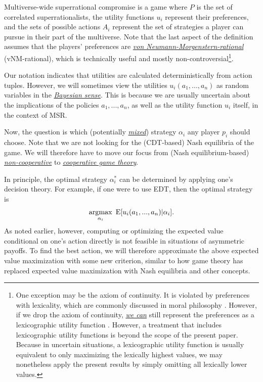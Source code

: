 Multiverse-wide superrational compromise is a game where \(P\) is the
set of correlated superrationalists, the utility functions \(u_{i}\)
represent their preferences, and the sets of possible actions \(A_{i}\)
represent the set of strategies a player can pursue in their part of the
multiverse. Note that the last aspect of the definition assumes that the
players' preferences are
\href{https://en.wikipedia.org/wiki/Von_Neumann\%E2\%80\%93Morgenstern_utility_theorem\#The_axioms}{\emph{von
Neumann-Morgenstern-rational}} (vNM-rational), which is technically
useful and mostly non-controversial\footnote{One exception may be the
  axiom of continuity. It is violated by preferences with lexicality,
  which are commonly discussed in moral philosophy
  \parencite{Knutsson2016-kd}. However, if we drop the axiom
  of continuity,
  \href{https://casparoesterheld.com/2016/08/08/lexicographic-utility-functions/}{\emph{we
  can}} still represent the preferences as a lexicographic utility
  function \parencite{Blume1989-fd,Fishburn1971-bx}.
  However, a treatment that includes lexicographic utility functions is
  beyond the scope of the present paper. Because in uncertain
  situations, a lexicographic utility function is usually equivalent to
  only maximizing the lexically highest values, we may nonetheless apply
  the present results by simply omitting all lexically lower values.}.

Our notation indicates that utilities are calculated deterministically
from action tuples. However, we will sometimes view the utilities
\(u_{i}(a_{1},...,a_{n})\) as random variables in the
\href{https://en.wikipedia.org/wiki/Bayesian_probability}{\emph{Bayesian
sense}}. This is because we are usually uncertain about the implications
of the policies \(a_{1},...,a_{n}\), as well as the utility function
\(u_{i}\) itself, in the context of MSR.

Now, the question is which (potentially
\href{https://en.wikipedia.org/wiki/Strategy_(game_theory)\#Mixed_strategy}{\emph{mixed}})
strategy \(\alpha_{i}\) any player \(p_{i}\) should choose. Note that we
are not looking for the (CDT-based) Nash equilibria of the game. We will
therefore have to move our focus from (Nash equilibrium-based)
\href{https://en.wikipedia.org/wiki/Non-cooperative_game_theory}{\emph{non-cooperative}}
to
\href{https://en.wikipedia.org/wiki/Cooperative_game_theory}{\emph{cooperative
game theory}}.

In principle, the optimal strategy \(\alpha_{i}^{*}\) can be determined
by applying one's decision theory. For example, if one were to use EDT,
then the optimal strategy is
$$
\operatorname*{\arg\!\max}_{\alpha_{i}}\ \mathrm{E}\lbrack u_{i}(a_{1},...,a_{n})|\alpha_{i}\rbrack.
$$
As noted earlier, however, computing or optimizing the expected value
conditional on one's action directly is not feasible in situations of
asymmetric payoffs. To find the best action, we will therefore
approximate the above expected value maximization with some new
criterion, similar to how game theory has replaced expected value
maximization with Nash equilibria and other concepts.

